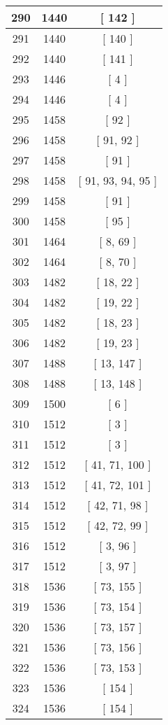 \begin{center}
\begin{longtable}[H]{|| c c c ||}
\hline
290 & 1440 & [ 142 ] \\ 
\hline
291 & 1440 & [ 140 ] \\ 
\hline
292 & 1440 & [ 141 ] \\ 
\hline
293 & 1446 & [ 4 ] \\ 
\hline
294 & 1446 & [ 4 ] \\ 
\hline
295 & 1458 & [ 92 ] \\ 
\hline
296 & 1458 & [ 91, 92 ] \\ 
\hline
297 & 1458 & [ 91 ] \\ 
\hline
298 & 1458 & [ 91, 93, 94, 95 ] \\ 
\hline
299 & 1458 & [ 91 ] \\ 
\hline
300 & 1458 & [ 95 ] \\ 
\hline
301 & 1464 & [ 8, 69 ] \\ 
\hline
302 & 1464 & [ 8, 70 ] \\ 
\hline
303 & 1482 & [ 18, 22 ] \\ 
\hline
304 & 1482 & [ 19, 22 ] \\ 
\hline
305 & 1482 & [ 18, 23 ] \\ 
\hline
306 & 1482 & [ 19, 23 ] \\ 
\hline
307 & 1488 & [ 13, 147 ] \\ 
\hline
308 & 1488 & [ 13, 148 ] \\ 
\hline
309 & 1500 & [ 6 ] \\ 
\hline
310 & 1512 & [ 3 ] \\ 
\hline
311 & 1512 & [ 3 ] \\ 
\hline
312 & 1512 & [ 41, 71, 100 ] \\ 
\hline
313 & 1512 & [ 41, 72, 101 ] \\ 
\hline
314 & 1512 & [ 42, 71, 98 ] \\ 
\hline
315 & 1512 & [ 42, 72, 99 ] \\ 
\hline
316 & 1512 & [ 3, 96 ] \\ 
\hline
317 & 1512 & [ 3, 97 ] \\ 
\hline
318 & 1536 & [ 73, 155 ] \\ 
\hline
319 & 1536 & [ 73, 154 ] \\ 
\hline
320 & 1536 & [ 73, 157 ] \\ 
\hline
321 & 1536 & [ 73, 156 ] \\ 
\hline
322 & 1536 & [ 73, 153 ] \\ 
\hline
323 & 1536 & [ 154 ] \\ 
\hline
324 & 1536 & [ 154 ] \\ 
\hline

\end{longtable}
\end{center}

